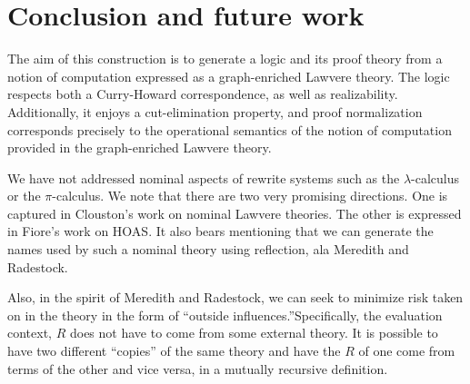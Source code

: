 \documentclass{llncs}
\renewcommand{\:}{\colon}
\newcommand{\pic}{$\pi$-calculus}
\newcommand{\lamc}{$\lambda$-calculus}
\begin{document}




\section{Conclusion and future work}

The aim of this construction is to generate a logic and its proof
theory from a notion of computation expressed as a graph-enriched
Lawvere theory. The logic respects both a Curry-Howard correspondence,
as well as realizability. Additionally, it enjoys a cut-elimination
property, and proof normalization corresponds precisely to the
operational semantics of the notion of computation provided in the
graph-enriched Lawvere theory.

We have not addressed nominal aspects of rewrite systems such as the
{\lamc} or the {\pic}. We note that there are two very
promising directions. One is captured in Clouston's work on nominal
Lawvere theories. \cite{DBLP:journals/jcss/Clouston14} The other is
expressed in Fiore's work on HOAS. \cite{DBLP:conf/csl/FioreH10} It
also bears mentioning that we can generate the names used by such a
nominal theory using reflection, ala Meredith and
Radestock. \cite{DBLP:conf/tgc/MeredithR05}

Also, in the spirit of Meredith and Radestock, we can seek to minimize
risk taken on in the theory in the form of “outside
influences.”Specifically, the evaluation context, $R$ does not have to
come from some external theory. It is possible to have two different
``copies'' of the same theory and have the $R$ of one come from terms
of the other and vice versa, in a mutually recursive definition.



\end{document}
